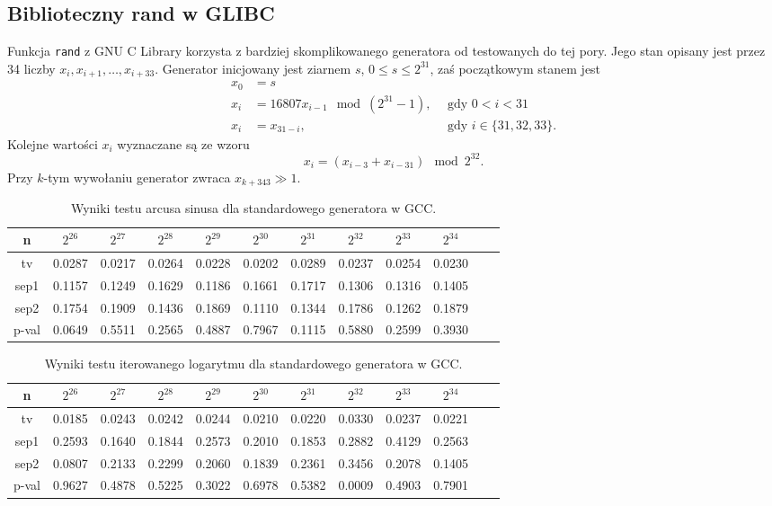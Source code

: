 \documentclass[a4paper,11pt,twoside]{book}
\theoremstyle{definition}
\begin{document}
\subsection{Biblioteczny rand w GLIBC}
Funkcja \texttt{rand} z GNU C Library korzysta z bardziej skomplikowanego generatora od testowanych do tej pory. Jego stan opisany jest przez 34 liczby  $x_i, x_{i+1},\ldots, x_{i+33}$. Generator inicjowany jest ziarnem $s$, $0 \leq s \leq 2^{31}$, zaś początkowym stanem jest
\begin{align*}
  x_0 &= s & \\
  x_i &= 16807 x_{i-1} \mod (2^{31}-1),\ \ &\mbox{gdy } 0 < i < 31\\
  x_i &= x_{31-i}, &\mbox{gdy } i \in \{31,32,33\}.
\end{align*}
Kolejne wartości $x_i$ wyznaczane są ze wzoru
\[ x_i = (x_{i-3} + x_{i-31}) \mod2^{32}. \]
Przy $k$-tym wywołaniu generator zwraca $x_{k+343} \gg 1$.
\begin{table}[ht!]
\centering
 \caption{Wyniki testu arcusa sinusa dla standardowego generatora w GCC.}
 \label{tab:mojkomp_asin}
\begin{tabular} {||c|c|c|c|c|c|c|c|c|c|c|c||}  
 \hline
     n &  $2^{26}$ &  $2^{27}$ &  $2^{28}$ &  $2^{29}$ &  $2^{30}$ &  $2^{31}$ &  $2^{32}$ &  $2^{33}$ &  $2^{34}$\\ \hline
     tv &  0.0287 &  0.0217 &  0.0264 &  0.0228 &  0.0202 &  0.0289 &  0.0237 &  0.0254 &  0.0230\\ \hline
   sep1 &  0.1157 &  0.1249 &  0.1629 &  0.1186 &  0.1661 &  0.1717 &  0.1306 &  0.1316 &  0.1405\\ \hline
   sep2 &  0.1754 &  0.1909 &  0.1436 &  0.1869 &  0.1110 &  0.1344 &  0.1786 &  0.1262 &  0.1879\\ \hline
  p-val &  0.0649 &  0.5511 &  0.2565 &  0.4887 &  0.7967 &  0.1115 &  0.5880 &  0.2599 &  0.3930\\ \hline 
\end{tabular}  
\end{table}
\begin{table}[ht!]
\centering
 \caption{Wyniki testu iterowanego logarytmu dla standardowego generatora w GCC.}
 \label{tab:mojkomp_lil}
\begin{tabular} {||c|c|c|c|c|c|c|c|c|c|c|c||}  
 \hline 
     n &  $2^{26}$ &  $2^{27}$ &  $2^{28}$ &  $2^{29}$ &  $2^{30}$ &  $2^{31}$ &  $2^{32}$ &  $2^{33}$ &  $2^{34}$\\ \hline
     tv &  0.0185 &  0.0243 &  0.0242 &  0.0244 &  0.0210 &  0.0220 &  0.0330 &  0.0237 &  0.0221\\ \hline
   sep1 &  0.2593 &  0.1640 &  0.1844 &  0.2573 &  0.2010 &  0.1853 &  0.2882 &  0.4129 &  0.2563\\ \hline
   sep2 &  0.0807 &  0.2133 &  0.2299 &  0.2060 &  0.1839 &  0.2361 &  0.3456 &  0.2078 &  0.1405\\ \hline
  p-val &  0.9627 &  0.4878 &  0.5225 &  0.3022 &  0.6978 &  0.5382 &  0.0009 &  0.4903 &  0.7901\\ \hline
\end{tabular}  
\end{table}
\end{document}
